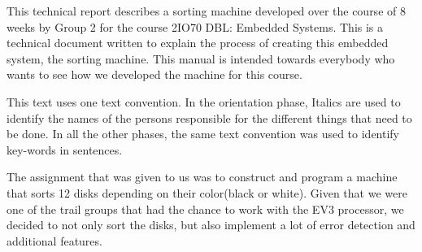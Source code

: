 This technical report describes a sorting machine developed over the course of 8 weeks by Group 2 for the course 2IO70 DBL: Embedded Systems. This is a technical document written to explain the process of creating this embedded system, the sorting machine. This manual is intended towards everybody who wants to see how we developed the machine for this course.

This text uses one text convention. In the orientation phase, Italics are used to identify the names of the persons responsible for the different things that need to be done. In all the other phases, the same text convention was used to identify key-words in sentences.

The assignment that was given to us was to construct and program a machine that sorts 12 disks depending on their color(black or white). Given that we were one of the trail groups that had the chance to work with the EV3 processor, we decided to not only sort the disks, but also implement a lot of error detection and additional features. 